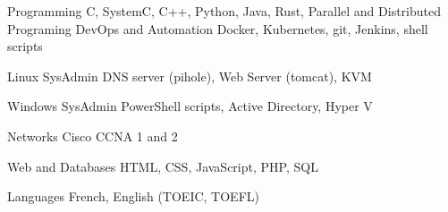 

\begin{cvskills}

  \cvskill
    {Programming} %
    {C, SystemC, C++, Python, Java, Rust, Parallel and Distributed Programing} %
  \cvskill
    {DevOps and Automation} %
    {Docker, Kubernetes, git, Jenkins, shell scripts} %

  \cvskill
    {Linux SysAdmin} %
    {DNS server (pihole), Web Server (tomcat), KVM} %

  \cvskill
    {Windows SysAdmin} %
    {PowerShell scripts, Active Directory, Hyper V} %

  \cvskill
    {Networks} %
    {Cisco CCNA 1 and 2} %

  \cvskill
    {Web and Databases} %
    {HTML, CSS, JavaScript, PHP, SQL} %

  \cvskill
    {Languages} %
    {French, English (TOEIC, TOEFL)} %

\end{cvskills}
